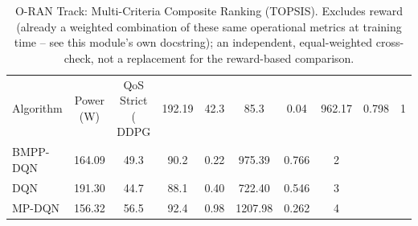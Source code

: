 \begin{table}[h]
\centering
\caption{O-RAN Track: Multi-Criteria Composite Ranking (TOPSIS). Excludes reward (already a weighted combination of these same operational metrics at training time -- see this module's own docstring); an independent, equal-weighted cross-check, not a replacement for the reward-based comparison.}
\begin{tabular}{lccccccc}
\hline
Algorithm & Power (W) & QoS Strict (%
\hline
DDPG & 192.19 & 42.3 & 85.3 & 0.04 & 962.17 & 0.798 & 1 \\
BMPP-DQN & 164.09 & 49.3 & 90.2 & 0.22 & 975.39 & 0.766 & 2 \\
DQN & 191.30 & 44.7 & 88.1 & 0.40 & 722.40 & 0.546 & 3 \\
MP-DQN & 156.32 & 56.5 & 92.4 & 0.98 & 1207.98 & 0.262 & 4 \\
\hline
\end{tabular}
\end{table}
